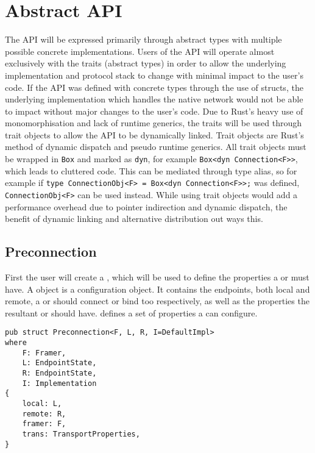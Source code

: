 \section{Abstract API}\label{sec:abstract-api}
The API will be expressed primarily through abstract types with multiple possible concrete implementations.
Users of the API will operate almost exclusively with the traits (abstract types) in order to allow the underlying
implementation and protocol stack to change with minimal impact to the user's code.
If the API was defined with concrete types through the use of structs, the underlying implementation which handles
the native network would not be able to impact without major changes to the user's code.
Due to Rust's heavy use of monomorphisation and lack of runtime generics, the traits will be used through trait objects
to allow the API to be dynamically linked.
Trait objects are Rust's method of dynamic dispatch and pseudo runtime generics.
All trait objects must be wrapped in \texttt{Box} and marked as \texttt{dyn}, for example
\texttt{Box<dyn Connection<F>>}, which leads to cluttered code.
This can be mediated through type alias, so for example if \texttt{type ConnectionObj<F> = Box<dyn Connection<F>>;} was
defined, \texttt{ConnectionObj<F>} can be used instead.
While using trait objects would add a performance overhead due to pointer indirection and dynamic dispatch, the benefit
of dynamic linking and alternative distribution out ways this.

\subsection{Preconnection}\label{subsec:preconnection}
First the user will create a \preconnection{}, which will be used to define the properties a \connection or \listener
must have.
A \preconnection{} object is a configuration object.
It contains the endpoints, both local and remote, a \connection{} or \listener{} should connect or bind too
respectively, as well as the properties the resultant \connection{} or \listener{} should have.
\cite[§~5.2]{trammell_abstractapplicationlayer_2020} defines a set of properties a \preconnection{} can configure.

\begin{lstlisting}[float=h, label=lst:preconnection, caption={The Preconnection struct, showing the four
generic parameters.}]
pub struct Preconnection<F, L, R, I=DefaultImpl>
where
    F: Framer,
    L: EndpointState,
    R: EndpointState,
    I: Implementation
{
    local: L,
    remote: R,
    framer: F,
    trans: TransportProperties,
}
\end{lstlisting}

